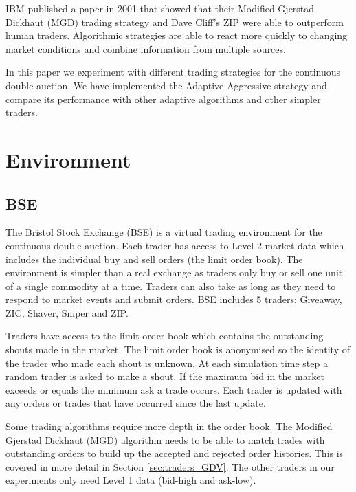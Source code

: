 \documentclass[preprint]{acm_proc_article-sp} %
\begin{document}
IBM published a paper in 2001 that showed that their Modified Gjerstad Dickhaut (MGD) trading strategy and
Dave Cliff's ZIP were able to outperform human traders\cite{ibm_human}.
Algorithmic strategies are able to react more quickly to changing market
conditions and combine information from multiple sources.

In this paper we experiment with different trading strategies for the
continuous double auction.
We have implemented the Adaptive Aggressive \cite{AA_thesis} strategy and compare its performance 
with other adaptive algorithms and other simpler traders.\\



\section{Environment} \label{sec:environment}
\subsection{BSE} \label{sec:BSE}
The Bristol Stock Exchange (BSE) is a virtual trading environment for the
continuous double auction. Each trader has access to Level 2 market data which
includes the individual buy and sell orders (the limit order book). The
environment is simpler than a real exchange as traders only buy or sell one
unit of a single commodity at a time. Traders can also take as long as they
need to respond to market events and submit orders. BSE includes 5 traders: Giveaway, ZIC, Shaver, Sniper and ZIP.

Traders have access to the limit order book which contains the outstanding
shouts made in the market. The limit order book is anonymised so the identity
of the trader who made each shout is unknown. At each simulation time step a
random trader is asked to make a shout. If the maximum bid in the market
exceeds or equals the minimum ask a trade occurs. Each trader is updated with
any orders or trades that have occurred since the last update.

Some trading algorithms require more depth in the order book. The Modified
Gjerstad Dickhaut (MGD) algorithm needs to be able to match trades with
outstanding orders to build up the accepted and rejected order histories.
This is covered in more detail in Section \ref{sec:traders_GDV}. The
other traders in our experiments only need Level 1 data
(bid-high and ask-low).
\end{document}
